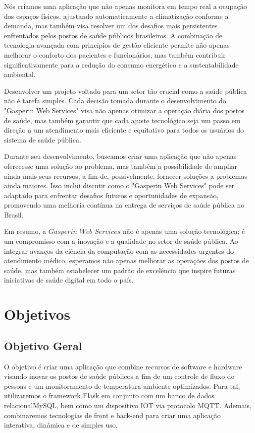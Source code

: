 \documentclass[conference, a4paper, 12pt]{IEEEtran}
\begin{document}
  Nós criamos uma aplicação que não apenas monitora em tempo real a ocupação dos espaços físicos, ajustando automaticamente a climatização conforme a demanda, mas também visa resolver um dos desafios mais persistentes enfrentados pelos postos de saúde públicos brasileiros. A combinação de tecnologia avançada com princípios de gestão eficiente permite não apenas melhorar o conforto dos pacientes e funcionários, mas também contribuir significativamente para a redução do consumo energético e a sustentabilidade ambiental.

  Desenvolver um projeto voltado para um setor tão crucial como a saúde pública não é tarefa simples. Cada decisão tomada durante o desenvolvimento do "Gasperin Web Services" visa não apenas otimizar a operação diária dos postos de saúde, mas também garantir que cada ajuste tecnológico seja um passo em direção a um atendimento mais eficiente e equitativo para todos os usuários do sistema de saúde pública.

  Durante seu desenvolvimento, buscamos criar uma aplicação que não apenas oferecesse uma solução ao problema, mas também a possibilidade de ampliar ainda mais seus recursos, a fim de, possivelmente, fornecer soluções a problemas ainda maiores. Isso inclui discutir como o "Gasperin Web Services" pode ser adaptado para enfrentar desafios futuros e oportunidades de expansão, promovendo uma melhoria contínua na entrega de serviços de saúde pública no Brasil.

  Em resumo, a $Gasperin$ $Web$ $Services$ não é apenas uma solução tecnológica; é um compromisso com a inovação e a qualidade no setor de saúde pública. Ao integrar avanços da ciência da computação com as necessidades urgentes do atendimento médico, esperamos não apenas melhorar as operações dos postos de saúde, mas também estabelecer um padrão de excelência que inspire futuras iniciativas de saúde digital em todo o país.

  \section{Objetivos}
  \subsection{Objetivo Geral}
  O objetivo é criar uma aplicação que combine recursos de software e hardware visando inovar os postos de saúde públicos a fim de um controle de fluxo de pessoas e um monitoramento de temperatura ambiente optimizados. Para tal, utilizaremos o framework Flask em conjunto com um banco de dados relacionalMySQL, bem como um dispositivo IOT via protocolo MQTT. Ademais, combinaremos tecnologias de front e back-end para criar uma aplicação interativa, dinâmica e de simples uso.
\end{document}

